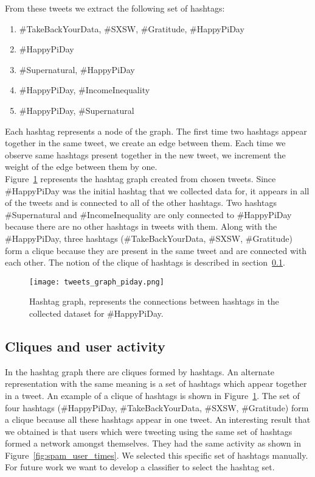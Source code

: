 \documentclass[journal, a4paper, 12pt]{article}
\begin{document}
From these tweets we extract the following set of hashtags:

\begin{enumerate}
\item \#TakeBackYourData, \#SXSW, \#Gratitude, \#HappyPiDay
\item \#HappyPiDay
\item \#Supernatural, \#HappyPiDay
\item \#HappyPiDay, \#IncomeInequality
\item \#HappyPiDay, \#Supernatural
\end{enumerate}


Each hashtag represents a node of the graph. The first time two hashtags appear together in the same tweet, we create an edge between them. Each time we observe same hashtags present together in the new tweet, we increment the weight of the edge between them by one.
\\

Figure~\ref{fig:tweets_graph_piday.png} represents the hashtag graph created from chosen tweets. Since \#HappyPiDay was the initial hashtag that we collected data for, it appears in all of the tweets and is connected to all of the other hashtags. Two hashtags \#Supernatural and \#IncomeInequality are only connected to \#HappyPiDay because there are no other hashtags in tweets with them. Along with the \#HappyPiDay, three hashtags (\#TakeBackYourData, \#SXSW, \#Gratitude) form a clique because they are present in the same tweet and are connected with each other. The notion of the clique of hashtags is described in section~\ref{cliques_subsection}.

    
        \begin{figure}[!hbt]
		\begin{center}
		\texttt{[image: tweets\_graph\_piday.png]}
		\caption{Hashtag graph, represents the connections between hashtags in the collected dataset for \#HappyPiDay.}
		\label{fig:tweets_graph_piday.png}
		\end{center}
	\end{figure}

\subsection{Cliques and user activity}\label{cliques_subsection}
In the hashtag graph there are cliques formed by hashtags. An alternate representation with the same meaning is a set of hashtags which appear together in a tweet. An example of a clique of hashtags is shown in Figure~\ref{fig:tweets_graph_piday.png}. The set of four hashtags (\#HappyPiDay, \#TakeBackYourData, \#SXSW, \#Gratitude) form a clique because all these hashtags appear in one tweet. An interesting result that we obtained is that users which were tweeting using the same set of hashtags formed a network amongst themselves. They had the same activity as shown in Figure~\ref{fig:spam_user_times}. We selected this specific set of hashtags manually. For future work we want to develop a classifier to select the hashtag set.
\\
\end{document}
